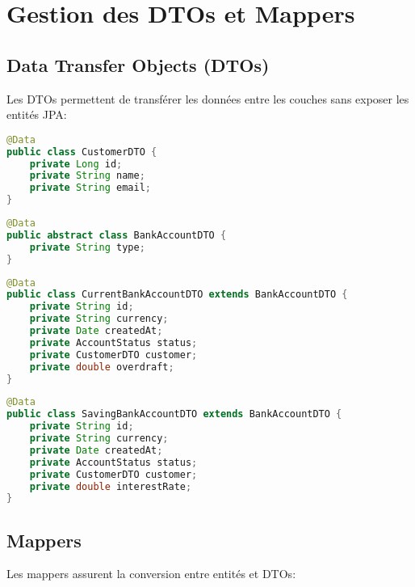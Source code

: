 \documentclass[12pt,a4paper]{report}
\begin{document}
\chapter{Gestion des DTOs et Mappers}
\section{Data Transfer Objects (DTOs)}
Les DTOs permettent de transférer les données entre les couches sans exposer les entités JPA:

\begin{lstlisting}[language=Java, caption=CustomerDTO.java]
@Data
public class CustomerDTO {
    private Long id;
    private String name;
    private String email;
}
\end{lstlisting}

\begin{lstlisting}[language=Java, caption=BankAccountDTO.java]
@Data
public abstract class BankAccountDTO {
    private String type;
}
\end{lstlisting}

\begin{lstlisting}[language=Java, caption=CurrentBankAccountDTO.java]
@Data
public class CurrentBankAccountDTO extends BankAccountDTO {
    private String id;
    private String currency;
    private Date createdAt;
    private AccountStatus status;
    private CustomerDTO customer;
    private double overdraft;
}
\end{lstlisting}

\begin{lstlisting}[language=Java, caption=SavingBankAccountDTO.java]
@Data
public class SavingBankAccountDTO extends BankAccountDTO {
    private String id;
    private String currency;
    private Date createdAt;
    private AccountStatus status;
    private CustomerDTO customer;
    private double interestRate;
}
\end{lstlisting}

\section{Mappers}
Les mappers assurent la conversion entre entités et DTOs:
\end{document}
